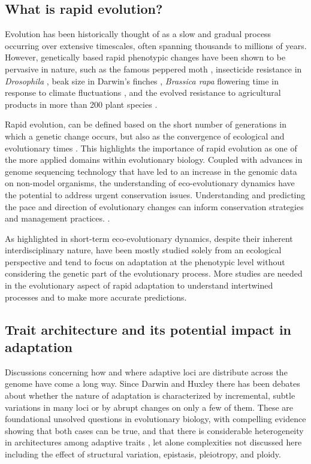 \documentclass{article}
\begin{document}
\subsection{What is rapid evolution?}
Evolution has been historically thought of as a slow and gradual process occurring over extensive timescales, often spanning thousands to millions of years. However, genetically based rapid phenotypic changes have been shown to be pervasive in nature, such as the famous peppered moth \citep{Cook2013-bs}, insecticide resistance in \textit{Drosophila} \citep{Daborn2002-is},  beak size in Darwin’s finches \citep{Grant2008-uc}, \textit{Brassica rapa} flowering time in response to climate fluctuations \citep{Franks2007-ys}, and the evolved resistance to agricultural products in more than 200 plant species \citep{Heap2020}. 

Rapid evolution, can be defined based on the short number of generations in which a genetic change occurs, but also as the convergence of ecological and evolutionary times \citep{Hairston2005-qo}. This highlights the importance of rapid evolution as one of the more applied domains within evolutionary biology. Coupled with advances in genome sequencing technology that have led to an increase in the genomic data on non-model organisms, the understanding of eco-evolutionary dynamics have the potential to address urgent conservation issues. Understanding and predicting the pace and direction of evolutionary changes can inform conservation strategies and management practices. \citep{Bay2017-uu, Coulson2017-yh, Forester2022-yl}.

As highlighted in \citep{Yamamichi2022-yj} short-term eco-evolutionary dynamics, despite their inherent interdisciplinary nature, have been mostly studied solely from an ecological perspective and tend to focus on adaptation at the phenotypic level without considering the genetic part of the evolutionary process. More studies are needed in the evolutionary aspect of rapid adaptation to understand intertwined processes and to make more accurate predictions. \citep{Rudman2022-uc}

\subsection{Trait architecture and its potential impact in adaptation}
Discussions concerning  how and where adaptive loci are distribute across the genome have come a long way. Since Darwin \citep{Darwin1859-yh} and Huxley \citep{Huxley1860} there has been debates about whether the nature of adaptation is characterized by incremental, subtle variations in many loci or by abrupt changes on only a few of them. These are foundational unsolved questions in evolutionary biology, with compelling evidence showing that both cases can be true, and that there is considerable heterogeneity in architectures among adaptive traits \citep{Orr1992-xj, Orr1998-pr}, let alone complexities not discussed here including  the effect of structural variation, epistasis, pleiotropy, and ploidy. 
\end{document}
